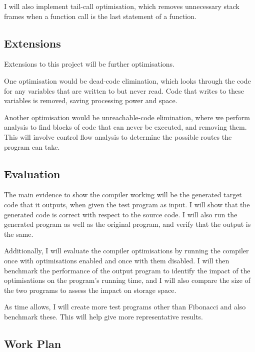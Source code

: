 I will also implement tail-call optimisation, which removes unnecessary stack frames when a function call is the last statement of a function.

\subsection*{Extensions}

Extensions to this project will be further optimisations.

One optimisation would be dead-code elimination, which looks through the code for any variables that are written to but never read. Code that writes to these variables is removed, saving processing power and space.

Another optimisation would be unreachable-code elimination, where we perform analysis to find blocks of code that can never be executed, and removing them. This will involve control flow analysis to determine the possible routes the program can take.


\subsection*{Evaluation}

The main evidence to show the compiler working will be the generated target code that it outputs, when given the test program as input. I will show that the generated code is correct with respect to the source code. I will also run the generated program as well as the original program, and verify that the output is the same.

Additionally, I will evaluate the compiler optimisations by running the compiler once with optimisations enabled and once with them disabled. I will then benchmark the performance of the output program to identify the impact of the optimisations on the program's running time, and I will also compare the size of the two programs to assess the impact on storage space.

As time allows, I will create more test programs other than Fibonacci and also benchmark these. This will help give more representative results.

\subsection*{Work Plan}

